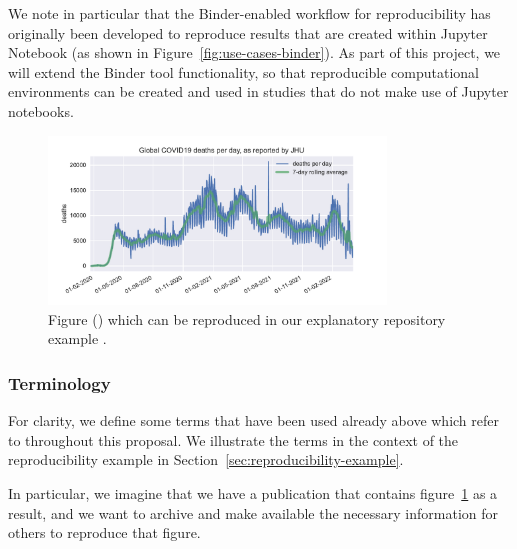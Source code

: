 We note in particular that the Binder-enabled workflow for reproducibility has
originally been developed to reproduce results that are created within Jupyter
Notebook (as shown in Figure~\ref{fig:use-cases-binder}). As part of this
project, we will extend the Binder tool functionality, so that reproducible
computational environments can be created and used in studies that do not make
use of Jupyter notebooks.

\begin{figure}
  \centering
  \includegraphics[width=0.8\textwidth]{images/figure1.pdf}
  \caption{Figure () which can be reproduced in our explanatory repository example
    \cite{ReproducibilityRepositoryExample2022}. \label{fig:reproducibility-example-covid}}
\end{figure}


\subsubsection{Terminology}\label{sec:terminology}

For clarity, we define some terms that have been used already above which refer to
throughout this proposal. We illustrate the terms in the context of the
reproducibility example in Section~\ref{sec:reproducibility-example}.

In particular, we imagine that we have a publication that contains
figure~\ref{fig:reproducibility-example-covid} as a result, and we want to
archive and make available \cite{ReproducibilityRepositoryExample2022} the
necessary information for others to reproduce that figure.

